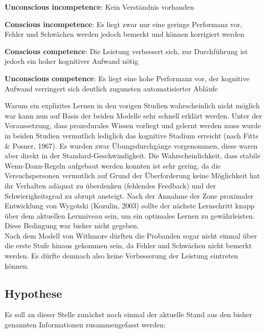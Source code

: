 \documentclass[doc,a4paper,12pt]{apa6}
\begin{document}
\begin{compactenum}
  \item \textbf{Unconscious incompetence}: Kein Verständnis vorhanden
  \item \textbf{Conscious incompetence}: Es liegt zwar nur eine geringe Performanz vor, Fehler und Schwächen werden jedoch bemerkt und können korrigiert werden
  \item \textbf{Conscious competence}: Die Leistung verbessert sich, zur Durchführung ist jedoch ein hoher kognitiver Aufwand nötig
  \item \textbf{Unconscious competence}: Es liegt eine hohe Performanz vor, der kognitive Aufwand verringert sich deutlich zugunsten automatisierter Abläufe
\end{compactenum}

Warum ein explizites Lernen in den vorigen Studien wahrscheinlich nicht möglich war kann nun auf Basis der beiden Modelle sehr schnell erklärt werden. Unter der Voraussetzung, dass prozedurales Wissen vorliegt und gelernt werden muss wurde in beiden Studien vermutlich lediglich das kognitive Stadium erreicht (nach Fitts \& Posner, 1967). Es wurden zwar Übungsdurchgänge vorgenommen, diese waren aber direkt in der Standard-Geschwindigkeit. Die Wahrscheinlichkeit, dass stabile Wenn-Dann-Regeln aufgebaut werden konnten ist sehr gering, da die Versuchspersonen vermutlich auf Grund der Überforderung keine Möglichkeit hat ihr Verhalten adäquat zu überdenken (fehlendes Feedback) und der Schwierigkeitsgrad zu abrupt ansteigt. Nach der Annahme der Zone proximaler Entwicklung von Wygotski (Kozulin, 2003) sollte der nächste Lernschritt knapp über dem aktuellen Lernniveau sein, um ein optimales Lernen zu gewährleisten. Diese Bedingung war bisher nicht gegeben.\\
Nach dem Modell von Withmore dürften die Probanden sogar nicht einmal über die erste Stufe hinaus gekommen sein, da Fehler und Schwächen nicht bemerkt werden. Es dürfte demnach also keine Verbesserung der Leistung eintreten können.

\subsection{Hypothese}

Es soll an dieser Stelle zunächst noch einmal der aktuelle Stand aus den bisher genannten Informationen zusammengefasst werden:
\end{document}
